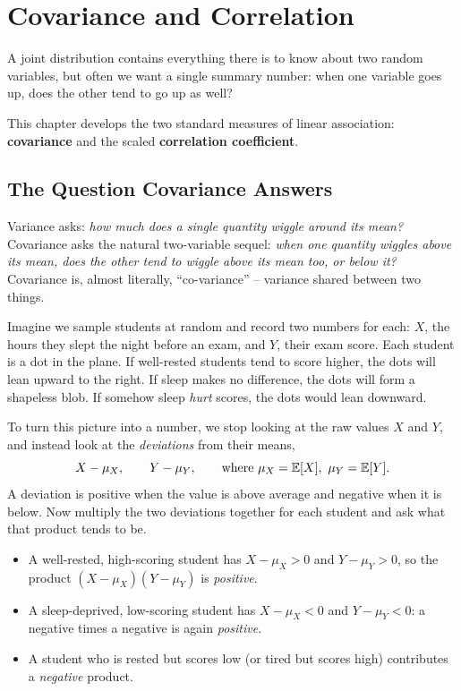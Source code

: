 \chapter{Covariance and Correlation}

A joint distribution contains everything there is to know about two random
variables, but often we want a single summary number: when one variable goes up,
does the other tend to go up as well?

This chapter develops the two standard measures of linear association:
\textbf{covariance} and the scaled \textbf{correlation coefficient}.

\section{The Question Covariance Answers}
\label{ch14:question}

\begin{intuitionbox}
Variance asks: \emph{how much does a single quantity wiggle around its mean?}
Covariance asks the natural two-variable sequel: \emph{when one quantity wiggles
above its mean, does the other tend to wiggle above its mean too, or below it?}
Covariance is, almost literally, ``co-variance'' -- variance shared between two
things.
\end{intuitionbox}

Imagine we sample students at random and record two
numbers for each: $X$, the hours they slept the night before an exam, and $Y$,
their exam score. Each student is a dot in the plane. If well-rested students tend
to score higher, the dots will lean upward to the right. If sleep makes no
difference, the dots will form a shapeless blob. If somehow sleep \emph{hurt}
scores, the dots would lean downward.

To turn this picture into a number, we stop looking at the raw values
$X$ and $Y$, and instead look at the \emph{deviations} from their means,
\[
X - \mu_X, \qquad Y - \mu_Y, \qquad \text{where } \mu_X = \operatorname{\mathbb{E}}[X],\ \mu_Y = \operatorname{\mathbb{E}}[Y].
\]
A deviation is positive when the value is above average and negative when it is
below. Now multiply the two deviations together for each student and ask what that
product tends to be.

\begin{itemize}
\item A well-rested, high-scoring student has $X - \mu_X > 0$ and $Y - \mu_Y > 0$,
so the product $(X-\mu_X)(Y-\mu_Y)$ is \emph{positive}.
\item A sleep-deprived, low-scoring student has $X - \mu_X < 0$ and
$Y - \mu_Y < 0$: a negative times a negative is again \emph{positive}.
\item A student who is rested but scores low (or tired but scores high) contributes
a \emph{negative} product.
\end{itemize}

